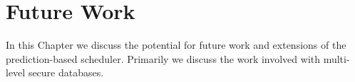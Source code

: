 \chapter{Future Work}\label{chap:future_work}

In this Chapter we discuss the potential for future work and extensions of the prediction-based scheduler. Primarily we discuss the work involved with multi-level secure databases.







